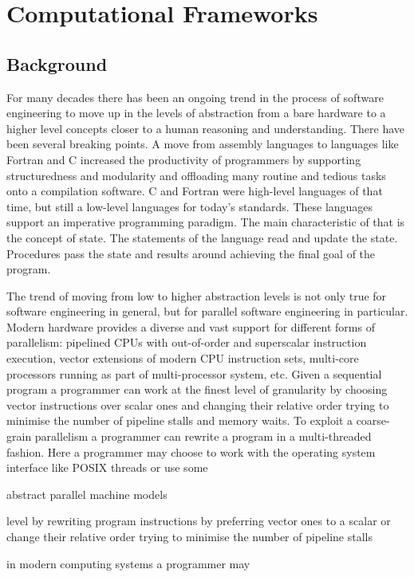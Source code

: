 \documentclass[10pt,a4paper]{report}
\begin{document}
\chapter{Computational Frameworks}

\section{Background}
\quad For many decades there has been an ongoing trend in the process of software engineering to move up in the levels of abstraction from a bare hardware to a higher level concepts closer to a human reasoning and understanding. There have been several breaking points. A move from assembly languages to languages like Fortran and C increased the productivity of programmers by supporting structuredness and modularity and offloading many routine and tedious tasks onto a compilation software. C and Fortran were high-level languages of that time, but still a low-level languages for today's standards. These languages support an imperative programming paradigm. The main characteristic of that is the concept of state. The statements of the language read and update the state. Procedures pass the state and results around achieving the final goal of the program.   

\quad The trend of moving from low to higher abstraction levels is not only true for software engineering in general, but for parallel software engineering in particular. Modern hardware provides a diverse and vast support for different forms of parallelism: pipelined CPUs with out-of-order and superscalar instruction execution, vector extensions of modern CPU instruction sets, multi-core processors running as part of multi-processor system, etc. Given a sequential program a programmer can work at the finest level of granularity by choosing vector instructions over scalar ones and changing their relative order trying to minimise the number of pipeline stalls and memory waits. To exploit a coarse-grain parallelism a programmer can rewrite a program in a multi-threaded fashion. Here a programmer may choose to work with the operating system interface like POSIX threads or use some 

abstract parallel machine models   


level by rewriting program instructions by preferring vector ones to a scalar or change their relative order trying to minimise the number of pipeline stalls    

in modern computing systems a programmer may 
\end{document}
